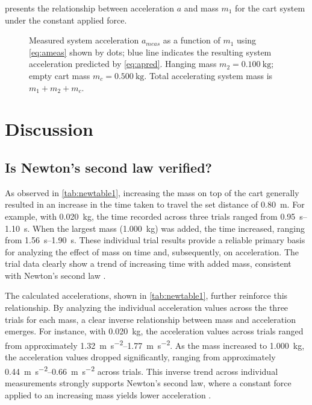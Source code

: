 ﻿\documentclass[reprint,amsmath,amssymb,aps]{revtex4-2}
\begin{document}
 presents the relationship between acceleration $a$ and mass $m_1$ for the cart system under the constant applied force. 
\begin{figure}
\begin{center}

\end{center}
\caption{\label{fig:5} Measured system acceleration $a_{meas}$ as a function of $m_1$ using \cref{eq:ameas} shown by dots; blue line indicates the resulting system acceleration predicted by \cref{eq:apred}. Hanging mass $m_2=\qty{0.100}{\kilo\gram}$; empty cart mass $m_c=\qty{0.500}{\kilo\gram}$. Total accelerating system mass is $m_1+m_2+m_c$.}
\end{figure}








\section{Discussion}

\subsection{Is Newton’s second law verified?}
As observed in \cref{tab:newtable1}, increasing the mass on top of the cart generally resulted in an increase in the time taken to travel the set distance of \qty{0.80}{\meter}. For example, with \qty{0.020}{\kilo\gram}, the time recorded across three trials ranged from \qtyrange{0.95}{1.10}{\second}. When the largest mass (\qty{1.000}{\kilo\gram}) was added, the time increased, ranging from \qtyrange{1.56}{1.90}{\second}. These individual trial results provide a reliable primary basis for analyzing the effect of mass on time and, subsequently, on acceleration. The trial data clearly show a trend of increasing time with added mass, consistent with Newton’s second law \cite{knight2017physics}.

The calculated accelerations, shown in \cref{tab:newtable1}, further reinforce this relationship. By analyzing the individual acceleration values across the three trials for each mass, a clear inverse relationship between mass and acceleration emerges. For instance, with \qty{0.020}{\kilo\gram}, the acceleration values across trials ranged from approximately \qtyrange{1.32}{1.77}{\meter\per\second\squared}. As the mass increased to \qty{1.000}{\kilo\gram}, the acceleration values dropped significantly, ranging from approximately \qtyrange{0.44}{0.66}{\meter\per\second\squared} across trials. This inverse trend across individual measurements strongly supports Newton’s second law, where a constant force applied to an increasing mass yields lower acceleration \cite{knight2017physics}. 
\end{document}

